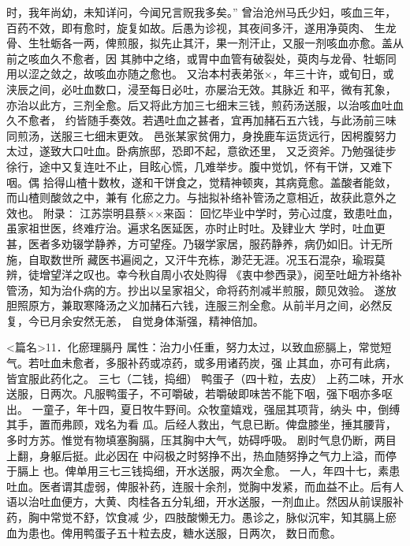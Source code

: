 \documentclass[a4paper,12pt,UTF8,twoside]{ctexbook}
\begin{document}
时，我年尚幼，未知详问，今闻兄言贶我多矣。” 
曾治沧州马氏少妇，咳血三年，百药不效，即有愈时，旋复如故。后愚为诊视，其夜间多汗，遂用净萸肉、 
生龙骨、生牡蛎各一两，俾煎服，拟先止其汗，果一剂汗止，又服一剂咳血亦愈。盖从前之咳血久不愈者，因 
其肺中之络，或胃中血管有破裂处，萸肉与龙骨、牡蛎同用以涩之敛之，故咳血亦随之愈也。 
又治本村表弟张×，年三十许，或旬日，或浃辰之间，必吐血数口，浸至每日必吐，亦屡治无效。其脉近 
和平，微有芤象，亦治以此方，三剂全愈。后又将此方加三七细末三钱，煎药汤送服，以治咳血吐血久不愈者， 
约皆随手奏效。若遇吐血之甚者，宜再加赭石五六钱，与此汤前三味同煎汤，送服三七细末更效。 
邑张某家贫佣力，身挽鹿车运货远行，因枵腹努力太过，遂致大口吐血。卧病旅邸，恐即不起，意欲还里， 
又乏资斧。乃勉强徒步徐行，途中又复连吐不止，目眩心慌，几难举步。腹中觉饥，怀有干饼，又难下咽。偶 
拾得山楂十数枚，遂和干饼食之，觉精神顿爽，其病竟愈。盖酸者能敛，而山楂则酸敛之中，兼有 
化瘀之力。与拙拟补络补管汤之意相近，故获此意外之效也。 
附录∶ 
江苏崇明县蔡××来函∶ 
回忆毕业中学时，劳心过度，致患吐血，虽家祖世医，终难疗治。遍求名医延医，亦时止时吐。及肄业大 
学时，吐血更甚，医者多劝辍学静养，方可望痊。乃辍学家居，服药静养，病仍如旧。计无所施，自取数世所 
藏医书遍阅之，又汗牛充栋，渺茫无涯。况玉石混杂，瑜瑕莫辨，徒增望洋之叹也。幸今秋自周小农处购得 
《衷中参西录》，阅至吐衄方补络补管汤，知为治仆病的方。抄出以呈家祖父，命将药剂减半煎服，颇见效验。 
遂放胆照原方，兼取寒降汤之义加赭石六钱，连服三剂全愈。从前半月之间，必然反复，今已月余安然无恙， 
自觉身体渐强，精神倍加。 


<篇名>11．化瘀理膈丹
属性：治力小任重，努力太过，以致血瘀膈上，常觉短气。若吐血未愈者，多服补药或凉药，或多用诸药炭，强 
止其血，亦可有此病，皆宜服此药化之。 
三七（二钱，捣细） 鸭蛋子（四十粒，去皮） 
上药二味，开水送服，日两次。凡服鸭蛋子，不可嚼破，若嚼破即味苦不能下咽，强下咽亦多呕出。 
一童子，年十四，夏日牧牛野间。众牧童嬉戏，强屈其项背，纳头 中，倒缚其手，置而弗顾，戏名为看 
瓜。后经人救出，气息已断。俾盘膝坐，捶其腰背，多时方苏。惟觉有物填塞胸膈，压其胸中大气，妨碍呼吸。 
剧时气息仍断，两目上翻，身躯后挺。此必因在 中闷极之时努挣不出，热血随努挣之气力上溢，而停于膈上 
也。俾单用三七三钱捣细，开水送服，两次全愈。 
一人，年四十七，素患吐血。医者谓其虚弱，俾服补药，连服十余剂，觉胸中发紧，而血益不止。后有人 
语以治吐血便方，大黄、肉桂各五分轧细，开水送服，一剂血止。然因从前误服补药，胸中常觉不舒，饮食减 
少，四肢酸懒无力。愚诊之，脉似沉牢，知其膈上瘀血为患也。俾用鸭蛋子五十粒去皮，糖水送服，日两次， 
数日而愈。 
\end{document}
